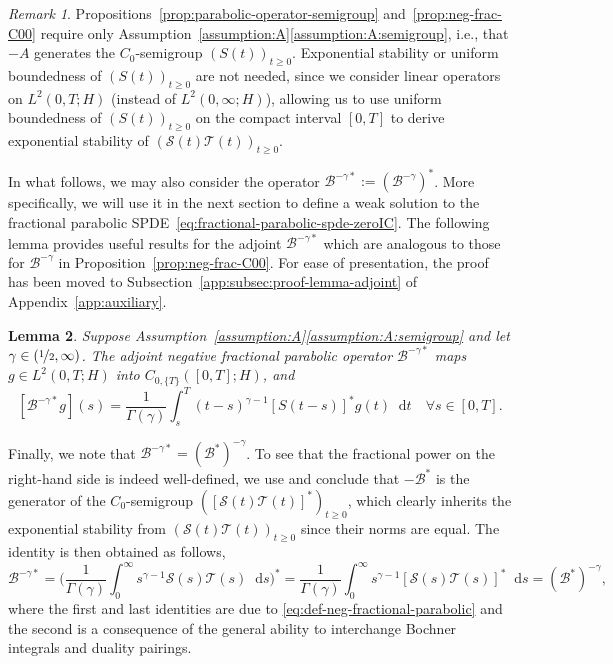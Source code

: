 \documentclass[reqno]{amsart}
\numberwithin{equation}{section}
\newcommand{\cB}{\mathcal{B}}
\newcommand{\cS}{\mathcal{S}}
\newcommand{\cT}{\mathcal{T}}
\newcommand{\rd}{\mathop{}\!\mathrm{d}}
\newcommand{\dual}[1]{#1^*}
\newtheorem{lemma}{Lemma}[section]
\theoremstyle{remark}
\newtheorem{remark}[lemma]{Remark}
\theoremstyle{definition}
\begin{document}
\begin{remark}
	Propositions~\ref{prop:parabolic-operator-semigroup} 
	and~\ref{prop:neg-frac-C00} require only 
	Assumption~\ref{assumption:A}\ref{assumption:A:semigroup}, i.e., 
	that $-A$ generates the $C_0$-semigroup $(S(t))_{t\geq 0}$. 
	Exponential stability or uniform boundedness 
	of $(S(t))_{t\geq 0}$ are not needed, 
	since we consider linear operators on $L^2(0,T;H)$ 
	(instead of $L^2(0,\infty;H)$), 
	allowing us to use uniform boundedness 
	of $(S(t))_{t\geq 0}$ on the compact interval $[0,T]$ 
	to derive exponential stability of $(\cS(t)\cT(t))_{t\geq 0}$. 
\end{remark} 

In what follows, we may also consider the  
operator $\cB^{-\gamma*} := (\cB^{-\gamma})^*$\!. 
More specifically, we will use it 
in the next section 
to define a weak solution  
to the fractional parabolic 
SPDE~\eqref{eq:fractional-parabolic-spde-zeroIC}. 
The following lemma 
provides useful results 
for the adjoint $\cB^{-\gamma*}$ 
which are analogous to those 
for $\cB^{-\gamma}$ in 
Proposition~\ref{prop:neg-frac-C00}.  
For ease of presentation, the 
proof has been moved to 
Subsection~\ref{app:subsec:proof-lemma-adjoint} 
of Appendix~\ref{app:auxiliary}. 

\begin{lemma}\label{lem:adjoint-neg-frac}
	Suppose Assumption~\textup{\ref{assumption:A}\ref{assumption:A:semigroup}}  
	and let $\gamma \in (\nicefrac{1}{2},\infty)$. 
	The adjoint negative fractional parabolic operator ${\cB^{-\gamma*}}$ 
	maps $g\in L^2(0,T;H)$ into $C_{0,\{T\}}([0,T];H)$, and  
	\begin{equation}\label{eq:adjoint-neg-parabolic-formula} 
	[ \cB^{-\gamma*}g ](s) 
	= 
	\frac{1}{\Gamma(\gamma)} 
	\int_s^T (t-s)^{\gamma-1} \dual{ [S(t-s)] } g(t) \rd t
	\quad 
	\forall s \in [0,T]. 
	\end{equation}
\end{lemma} 

Finally, we note that $\cB^{-\gamma*} = (\cB^*)^{-\gamma}$\!. 
To see that the fractional power on the right-hand side 
is indeed well-defined, we use 
\cite[Chapter~1, Corollary 10.6]{Pazy1983}
and conclude that $-\cB^*$ is the generator 
of the $C_0$-semigroup 
$([\cS(t)\cT(t)]^*)_{t\geq 0}$, 
which clearly inherits the exponential stability 
from $( \cS(t) \cT(t))_{t\geq 0}$ 
since their norms are equal. 
The identity is then obtained as follows, 
%
\[
\cB^{-\gamma*} 
= 
\biggl(\frac{1}{\Gamma(\gamma)} 
\int_0^\infty s^{\gamma-1} \cS(s) \cT(s) \rd s\biggr)^* 
= 
\frac{1}{\Gamma(\gamma)} \int_0^\infty
s^{\gamma-1} [ \cS(s) \cT(s)]^*\rd s 
= 
(\cB^*)^{-\gamma}\!,
\]
%
where the first and last identities are 
due to \eqref{eq:def-neg-fractional-parabolic} and the second 
is a consequence of the general ability 
to interchange Bochner integrals and duality pairings.
\end{document}
